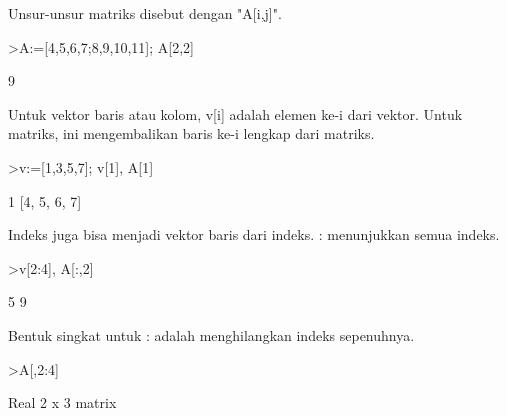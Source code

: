 \documentclass[a4paper,10pt]{article}
\begin{document}
\begin{eulernotebook}
\begin{eulercomment}
\begin{eulercomment}
\begin{eulercomment}
\begin{eulercomment}
\begin{eulercomment}
Unsur-unsur matriks disebut dengan "A[i,j]".
\end{eulercomment}
\begin{eulerprompt}
>A:=[4,5,6,7;8,9,10,11]; A[2,2]
\end{eulerprompt}
\begin{euleroutput}
  9
\end{euleroutput}
\begin{eulercomment}
Untuk vektor baris atau kolom, v[i] adalah elemen ke-i dari vektor.
Untuk matriks, ini mengembalikan baris ke-i lengkap dari matriks.
\end{eulercomment}
\begin{eulerprompt}
>v:=[1,3,5,7]; v[1], A[1]
\end{eulerprompt}
\begin{euleroutput}
  1
  [4,  5,  6,  7]
\end{euleroutput}
\begin{eulercomment}
Indeks juga bisa menjadi vektor baris dari indeks. : menunjukkan semua
indeks.
\end{eulercomment}
\begin{eulerprompt}
>v[2:4], A[:,2]
\end{eulerprompt}
\begin{euleroutput}
  [3,  5,  7]
                        5 
                        9 
\end{euleroutput}
\begin{eulercomment}
Bentuk singkat untuk : adalah menghilangkan indeks sepenuhnya.
\end{eulercomment}
\begin{eulerprompt}
>A[,2:4]
\end{eulerprompt}
\begin{euleroutput}
  Real 2 x 3 matrix
  

\end{euleroutput}
\end{eulercomment}
\end{eulercomment}
\end{eulercomment}
\end{eulercomment}
\end{eulernotebook}
\end{document}
